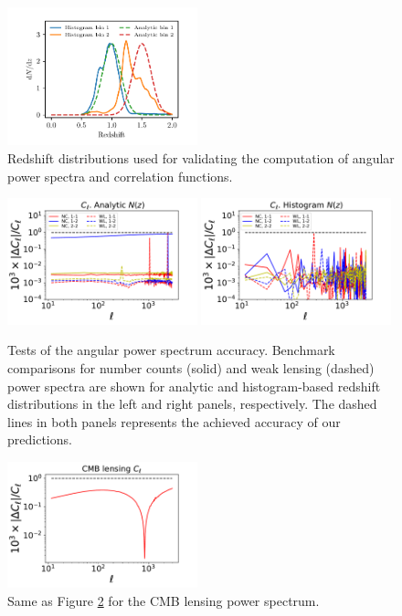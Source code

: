 \documentclass[\docopts]{\docclass}
\begin{document}
\begin{figure}
\centering
\includegraphics[width=0.49\textwidth]{dNdz_codecomp}
\caption{Redshift distributions used for validating the computation of angular power spectra and correlation functions.}
\label{fig:zhistos}
\end{figure}
\begin{figure}
\includegraphics[width=0.49\textwidth]{Cl_analytic}
\includegraphics[width=0.49\textwidth]{Cl_histo}
\caption{Tests of the angular power spectrum accuracy. Benchmark comparisons for number counts (solid) and weak lensing (dashed) power spectra are shown for analytic and histogram-based redshift distributions in the left and right panels, respectively. The dashed lines in both panels represents the achieved accuracy of our predictions.}
\label{fig:cls_limber}
\end{figure}
\begin{figure}
\includegraphics[width=0.49\textwidth]{Cl_cmblens}
\caption{Same as Figure \ref{fig:cls_limber} for the CMB lensing power spectrum.}
\label{fig:cls_cmblens}
\end{figure}
\end{document}

